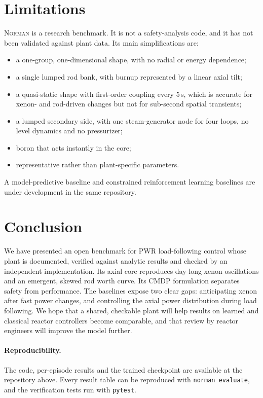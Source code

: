 \documentclass[11pt,a4paper]{article}
\newcommand{\Norman}{\textsc{Norman}}
\begin{document}
\section{Limitations}\label{sec:limitations}

\Norman{} is a research benchmark. It is not a safety-analysis code, and it has not
been validated against plant data. Its main simplifications are:
\begin{itemize}
  \item a one-group, one-dimensional shape, with no radial or energy dependence;
  \item a single lumped rod bank, with burnup represented by a linear axial tilt;
  \item a quasi-static shape with first-order coupling every 5\,s, which is accurate for
  xenon- and rod-driven changes but not for sub-second spatial transients;
  \item a lumped secondary side, with one steam-generator node for four loops, no level
  dynamics and no pressurizer;
  \item boron that acts instantly in the core;
  \item representative rather than plant-specific parameters.
\end{itemize}
A model-predictive baseline and constrained reinforcement learning baselines are under
development in the same repository.

\section{Conclusion}

We have presented an open benchmark for PWR load-following control whose plant is
documented, verified against analytic results and checked by an independent
implementation. Its axial core reproduces day-long xenon oscillations and an emergent,
skewed rod worth curve. Its CMDP formulation separates safety from performance. The
baselines expose two clear gaps: anticipating xenon after fast power changes, and
controlling the axial power distribution during load following. We hope that a shared,
checkable plant will help results on learned and classical reactor controllers become
comparable, and that review by reactor engineers will improve the model further.

\paragraph{Reproducibility.} The code, per-episode results and the trained checkpoint
are available at the repository above. Every result table can be reproduced with
\texttt{norman evaluate}, and the verification tests run with \texttt{pytest}.

\renewcommand{\bibfont}{\small\raggedright}


\end{document}
